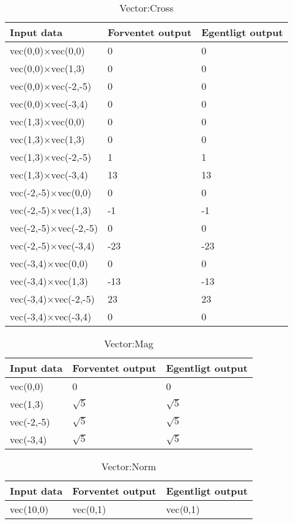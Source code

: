 \begin{table}[!h]
	\caption{Vector:Cross}
	\centering
	\begin{tabular}{L L L}
		\hline\hline
		Input data & Forventet output & Egentligt output \\ [0.5ex]
		\hline
		vec(0,0)$\times$vec(0,0) & 0 & 0\\
		vec(0,0)$\times$vec(1,3) & 0 & 0\\
		vec(0,0)$\times$vec(-2,-5) & 0 & 0\\
		vec(0,0)$\times$vec(-3,4) & 0 & 0\\
		\hline
		vec(1,3)$\times$vec(0,0) & 0 & 0\\
		vec(1,3)$\times$vec(1,3) & 0 & 0\\
		vec(1,3)$\times$vec(-2,-5) & 1 & 1\\
		vec(1,3)$\times$vec(-3,4) & 13 & 13\\
		\hline
		vec(-2,-5)$\times$vec(0,0) & 0 & 0\\
		vec(-2,-5)$\times$vec(1,3) & -1 & -1\\
		vec(-2,-5)$\times$vec(-2,-5) & 0 & 0\\
		vec(-2,-5)$\times$vec(-3,4) & -23 & -23\\
		\hline
		vec(-3,4)$\times$vec(0,0) & 0 & 0\\
		vec(-3,4)$\times$vec(1,3) & -13 & -13\\
		vec(-3,4)$\times$vec(-2,-5) & 23 & 23\\
		vec(-3,4)$\times$vec(-3,4) & 0 & 0\\
		\hline
	\end{tabular}
\end{table}

\begin{table}[!h]
	\caption{Vector:Mag}
	\centering
	\begin{tabular}{L L L}
		\hline\hline
		Input data & Forventet output & Egentligt output \\ [0.5ex]
		\hline
		vec(0,0) & 0 & 0\\
		vec(1,3)  & $\sqrt{5}$ & $\sqrt{5}$\\
		vec(-2,-5) & $\sqrt{5}$ & $\sqrt{5}$\\
		vec(-3,4) & $\sqrt{5}$ & $\sqrt{5}$\\
		\hline
	\end{tabular}
\end{table}

\begin{table}[!h]
	\caption{Vector:Norm}
	\centering
	\begin{tabular}{L L L}
		\hline\hline
		Input data & Forventet output & Egentligt output \\ [0.5ex]
		\hline
		vec(10,0) & vec(0,1) & vec(0,1)\\
		\hline
	\end{tabular}
\end{table}

